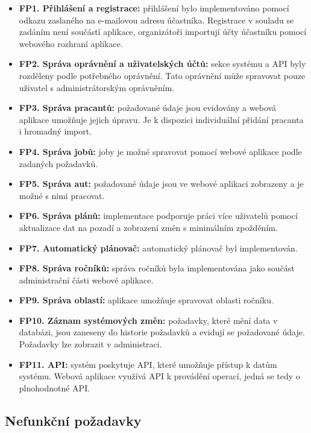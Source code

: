 \begin{itemize}
  \item \textbf{FP1. Přihlášení a registrace:} přihlášení bylo implementováno pomocí odkazu zaslaného na e-mailovou adresu účastníka. Registrace v souladu se zadáním není součástí aplikace, organizátoři importují účty účastníku pomocí webového rozhraní aplikace.
  \item \textbf{FP2. Správa oprávnění a uživatelských účtů:} sekce systému a API byly rozděleny podle potřebného oprávnění. Tato oprávnění může spravovat pouze uživatel s 
  administrátorským oprávněním.
  \item \textbf{FP3. Správa pracantů:} požadované údaje jsou evidovány a webová aplikace umožňuje jejich úpravu. Je k dispozici individuální přidání pracanta i hromadný import.
  \item \textbf{FP4. Správa jobů:} joby je možné spravovat pomocí webové aplikace podle zadaných požadavků.
  \item \textbf{FP5. Správa aut:} požadované údaje jsou ve webové aplikaci zobrazeny a je možné s nimi pracovat.
  \item \textbf{FP6. Správa plánů:} implementace podporuje práci více uživatelů pomocí aktualizace dat na pozadí a zobrazení změn s minimálním zpožděním. 
  \item \textbf{FP7. Automatický plánovač:} automatický plánovač byl implementován.
  \item \textbf{FP8. Správa ročníků:} správa ročníků byla implementována jako součást administrační části webové aplikace.
  \item \textbf{FP9. Správa oblastí:} aplikace umožňuje spravovat oblasti ročníku.
  \item \textbf{FP10. Záznam systémových změn:} požadavky, které mění data v databázi, jsou zaneseny do historie požadavků a evidují se požadované údaje. Požadavky
  lze zobrazit v administraci.
  \item \textbf{FP11. API:} systém poskytuje API, které umožňuje přístup k datům systému. Webová aplikace využívá API k provádění operací, jedná se tedy o plnohodnotné API.
\end{itemize}

\subsection{Nefunkční požadavky}


